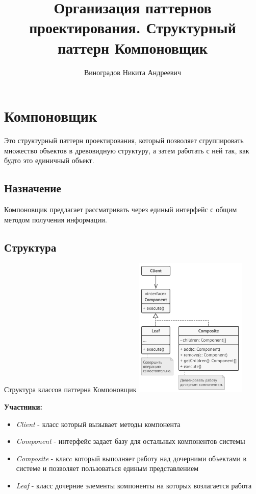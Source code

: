 \documentclass[PI,LAB]{HSEUniversity}
\title{Организация паттернов проектирования. Структурный паттерн Компоновщик}
\author{Виноградов Никита Андреевич}
\begin{document}
\maketitle



\chapter{Компоновщик}
Это структурный паттерн проектирования, который позволяет сгруппировать множество объектов в древовидную структуру, а затем работать с ней так, как будто это единичный объект.
\section{Назначение}
Компоновщик предлагает рассматривать  через единый интерфейс с общим методом получения информации.
\section{Структура}

\begin{FIGURE}[h]{Структура классов паттерна Компоновщик\label{fig:example-figure}}
    \includegraphics[width=0.4\textwidth]{../out/diagrams/structure-ru}
\end{FIGURE}

\textbf{Участники:}
\begin{itemize}
    \item \emph{Client} - класс который вызывает методы компонента
    \item \emph{Component} - интерфейс задает базу для остальных компонентов системы
    \item \emph{Composite} - класc который выполняет работу над дочерними объектами в системе и позволяет пользоваться единым представлением
    \item \emph{Leaf} - класс дочерние элементы компоненты на которых возлагается работа
\end{itemize}
\end{document}
